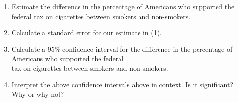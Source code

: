 \documentclass[11pt, chapterprefix=true]{scrbook}\usepackage[]{graphicx}\usepackage[]{color}
\begin{document}
\begin{exercises}
\begin{exercise}
	  \begin{enumerate}
	  \item Estimate the difference in the percentage of Americans who supported the \\ federal tax on cigarettes between smokers and non-smokers.
    \item Calculate a standard error for our estimate in (1).
    \item Calculate a 95\% confidence interval for the difference in the percentage of \\ Americans who supported the federal \\ tax on cigarettes between smokers and non-smokers.
    \item Interpret the above confidence intervals above in context.  Is it significant? Why or why not?
	  \end{enumerate}

	\end{exercise}
%
%


\end{exercises}
\end{document}
